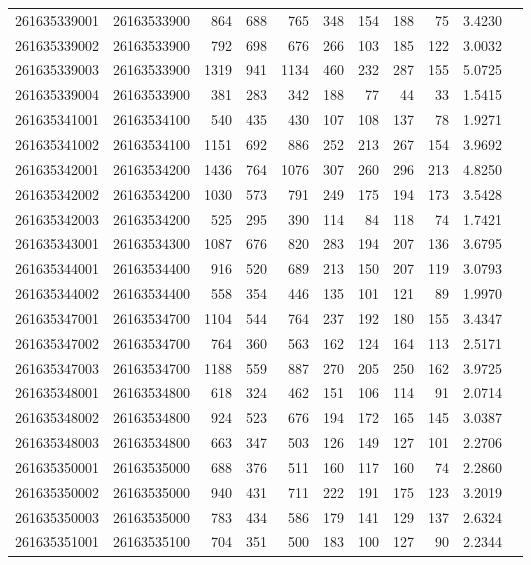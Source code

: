 \documentclass[11pt,landscape]{article}
\begin{document}
{\begin{longtable}[]{@{}lrrrrrrrrrr@{}}
261635339001 & 26163533900 & 864 & 688 & 765 & 348 & 154 & 188 & 75 & 3.4230 \\
261635339002 & 26163533900 & 792 & 698 & 676 & 266 & 103 & 185 & 122 & 3.0032 \\
261635339003 & 26163533900 & 1319 & 941 & 1134 & 460 & 232 & 287 & 155 & 5.0725 \\
261635339004 & 26163533900 & 381 & 283 & 342 & 188 & 77 & 44 & 33 & 1.5415 \\
261635341001 & 26163534100 & 540 & 435 & 430 & 107 & 108 & 137 & 78 & 1.9271 \\
261635341002 & 26163534100 & 1151 & 692 & 886 & 252 & 213 & 267 & 154 & 3.9692 \\
261635342001 & 26163534200 & 1436 & 764 & 1076 & 307 & 260 & 296 & 213 & 4.8250 \\
261635342002 & 26163534200 & 1030 & 573 & 791 & 249 & 175 & 194 & 173 & 3.5428 \\
261635342003 & 26163534200 & 525 & 295 & 390 & 114 & 84 & 118 & 74 & 1.7421 \\
261635343001 & 26163534300 & 1087 & 676 & 820 & 283 & 194 & 207 & 136 & 3.6795 \\
261635344001 & 26163534400 & 916 & 520 & 689 & 213 & 150 & 207 & 119 & 3.0793 \\
261635344002 & 26163534400 & 558 & 354 & 446 & 135 & 101 & 121 & 89 & 1.9970 \\
261635347001 & 26163534700 & 1104 & 544 & 764 & 237 & 192 & 180 & 155 & 3.4347 \\
261635347002 & 26163534700 & 764 & 360 & 563 & 162 & 124 & 164 & 113 & 2.5171 \\
261635347003 & 26163534700 & 1188 & 559 & 887 & 270 & 205 & 250 & 162 & 3.9725 \\
261635348001 & 26163534800 & 618 & 324 & 462 & 151 & 106 & 114 & 91 & 2.0714 \\
261635348002 & 26163534800 & 924 & 523 & 676 & 194 & 172 & 165 & 145 & 3.0387 \\
261635348003 & 26163534800 & 663 & 347 & 503 & 126 & 149 & 127 & 101 & 2.2706 \\
261635350001 & 26163535000 & 688 & 376 & 511 & 160 & 117 & 160 & 74 & 2.2860 \\
261635350002 & 26163535000 & 940 & 431 & 711 & 222 & 191 & 175 & 123 & 3.2019 \\
261635350003 & 26163535000 & 783 & 434 & 586 & 179 & 141 & 129 & 137 & 2.6324 \\
261635351001 & 26163535100 & 704 & 351 & 500 & 183 & 100 & 127 & 90 & 2.2344 \\

\end{longtable}}
\end{document}
